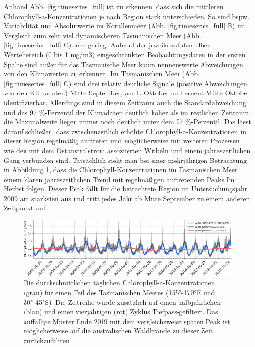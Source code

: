 \documentclass[12pt,a4paper,onecolumn,headheight=30pt]{scrartcl}
\begin{document}
Anhand Abb. \ref{fig:timeseries_full} ist zu erkennen, dass sich die mittleren Chlorophyll-a-Konzentrationen je nach Region stark unterschieden. So sind bspw. Variabilität und Absolutwerte im Korallenmeer (Abb. \ref{fig:timeseries_full} B) im Vergleich zum sehr viel dynamischeren Tasmanischen Meer (Abb. \ref{fig:timeseries_full} C) sehr gering. Anhand der jeweils auf denselben Wertebereich (0 bis 1 mg/m3) eingeschränkten Beobachtungsdaten in der ersten Spalte sind außer für das Tasmanische Meer kaum nennenswerte Abweichungen von den Klimawerten zu erkennen. Im Tasmanischen Meer (Abb. \ref{fig:timeseries_full} C) sind drei relativ deutliche Signale (positive Abweichungen von den Klimadaten) Mitte September, am 1. Oktober und erneut Mitte Oktober identifizierbar. Allerdings sind in diesem Zeitraum auch die Standardabweichung und das 97 \%-Perzentil der Klimadaten deutlich höher als im restlichen Zeitraum, die Maximalwerte liegen immer noch deutlich unter dem 97 \%-Perzentil. Das lässt darauf schließen, dass zwischenzeitlich erhöhte Chlorophyll-a-Konzentrationen in dieser Region regelmäßig auftreten und möglicherweise mit weiteren Prozessen wie den mit dem Ostaustralstrom assoziierten Wirbeln und einem jahreszeitlichen Gang \citep{Tilburg.2002} verbunden sind. Tatsächlich sieht man bei einer mehrjährigen Betrachtung in Abbildung \ref{fig:long_timeseries_tasman}, dass die Chlorophyll-Konzentrationen im Tasmanischen Meer einem klaren jahreszeitlichen Trend mit regelmäßigen auftretenden Peaks Im Herbst folgen. Dieser Peak fällt für die betrachtete Region im Untersuchungsjahr 2009 am stärksten aus und tritt jedes Jahr ab Mitte September zu einem anderen Zeitpunkt auf.
\begin{figure}[htbp]
\includegraphics[width=\textwidth]{bilder/long_timeseries_tasman.png}
\caption{Die durchschnittlichen täglichen Chlorophyll-a-Konzentrationen (grau) für einen Teil des Tasmanischen Meeres (155°-170°E und 30°-45°S). Die Zeitreihe wurde zusätzlich auf einen halbjährlichen (blau) und einen vierjährigen (rot) Zyklus Tiefpass-gefiltert. Das auffällige Muster Ende 2019 mit dem vergleichsweise späten Peak ist möglicherweise auf die australischen Waldbrände zu dieser Zeit zurückzuführen \citep{Li.2021}.} \label{fig:long_timeseries_tasman}
\end{figure}
\end{document}
